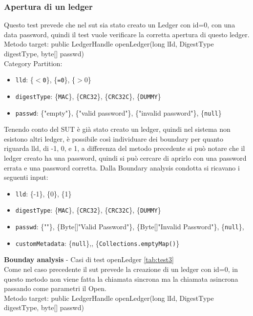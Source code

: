 \documentclass[10pt]{article}
\begin{document}
{		\subsubsection{Apertura di un ledger}
		Questo test prevede che nel sut sia stato creato un Ledger con id=0, con una data password, quindi il test vuole verificare la corretta apertura di questo ledger.\\
		Metodo target: public LedgerHandle openLedger(long lId, DigestType digestType, byte[] passwd)\\
		Category Partition: 
		\begin{itemize}[label=--, itemsep=2pt, parsep=0pt]
			\item \texttt{lld}: \{\texttt{$<$0}\}, \{\texttt{=0}\}, \{\texttt{$>0$}\}
			\item \texttt{digestType}: \{\texttt{MAC}\}, \{\texttt{CRC32}\}, \{\texttt{CRC32C}\}, \{\texttt{DUMMY}\}
			\item \texttt{passwd}: \{"empty"\}, \{"valid password"\}, \{"invalid password"\}, \{\texttt{null}\}
		\end{itemize}
		Tenendo conto del SUT è già stato creato un ledger, quindi nel sistema non esistono altri ledger, è possibile così individuare dei boundary per quanto riguarda lld, di -1, 0, e 1, 
		a differenza del metodo precedente si può notare che il ledger creato ha una password, quindi si può cercare di aprirlo con una password errata e una password corretta.
		Dalla Boundary analysis condotta si ricavano i seguenti input:
		\begin{itemize}[label=--, itemsep=2pt, parsep=0pt]
			\item \texttt{lld}: \{-1\}, \{0\}, \{1\}
			\item \texttt{digestType}: \{\texttt{MAC}\}, \{\texttt{CRC32}\}, \{\texttt{CRC32C}\}, \{\texttt{DUMMY}\}
			\item \texttt{passwd}: \{""\}, \{Byte[]"Valid Password"\}, \{Byte[]"Invalid Password"\}, \{\texttt{null}\},
			\item \texttt{customMetadata}:  \{\texttt{null}\},,  \{\texttt{Collections.emptyMap()}\}
		\end{itemize}
		\textbf{Bounday analysis}
		- Casi di test openLedger \autoref{tab:test3}\\
		Come nel caso precedente il sut prevede la creazione di un ledger con id=0, in questo metodo non viene fatta la chiamata sincrona ma la chiamata asincrona passando come parametri il Open.\\
		Metodo target: public LedgerHandle openLedger(long lId, DigestType digestType, byte[] passwd)\\
}
\end{document}
